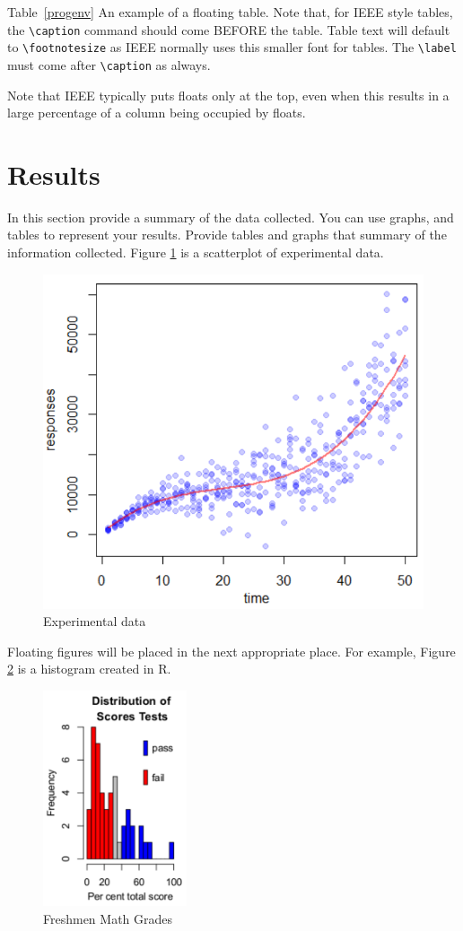 \documentclass[journal,12pt]{IEEEtran}
\begin{document}
Table~\ref{progenv} An example of a floating table. Note that, for IEEE style tables, the 
\verb|\caption| command should come BEFORE the table. Table text will default to
\verb|\footnotesize| as IEEE normally uses this smaller font for tables.
The \verb|\label| must come after \verb|\caption| as always.

Note that IEEE typically puts floats only at the top, even when this
results in a large percentage of a column being occupied by floats.

\section{Results}
\label{sec:results}

In this section provide a summary of the data collected. You can use graphs, and tables to represent your results.
Provide tables and graphs that summary of the information collected. Figure \ref{fig_experiment}
is a scatterplot of experimental data. 

\begin{figure}[htb]
\centering
\caption{Experimental data}
\label{fig_experiment}
\includegraphics[width=0.9\columnwidth]{img/experiment.pdf}
\end{figure}

Floating figures will be placed in the next appropriate place. For example, Figure \ref{fig_histogram} is a histogram created in R.

\begin{figure}[htb]
\centering
\includegraphics[width=0.8\columnwidth,height=2.5in]{img/Rplot.pdf}
\caption{Freshmen Math Grades}
\label{fig_histogram}
\end{figure}
\end{document}
